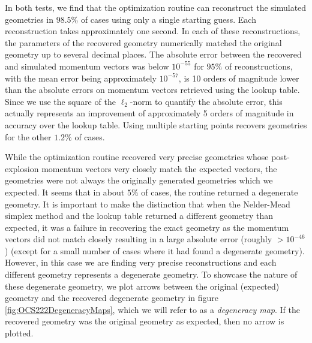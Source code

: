 In both tests, we find that the optimization routine can reconstruct the simulated geometries in $98.5\%$ of cases using only a single starting guess. Each reconstruction takes approximately one second. In each of these reconstructions, the parameters of the recovered geometry numerically matched the original geometry up to several decimal places. The absolute error between the recovered and simulated momentum vectors was below $10^{-55}$ for $95\%$ of reconstructions, with the mean error being approximately $10^{-57}$, is 10 orders of magnitude lower than the absolute errors on momentum vectors retrieved using the lookup table. Since we use the square of the $\ell_2$-norm to quantify the absolute error, this actually represents an improvement of approximately 5 orders of magnitude in accuracy over the lookup table. Using multiple starting points recovers geometries for the other $1.2\%$ of cases.

While the optimization routine recovered very precise geometries whose post-explosion momentum vectors very closely match the expected vectors, the geometries were not always the originally generated geometries which we expected. It seems that in about $5\%$ of cases, the routine returned a degenerate geometry. It is important to make the distinction that when the Nelder-Mead simplex method and the lookup table returned a different geometry than expected, it was a failure in recovering the exact geometry as the momentum vectors did not match closely resulting in a large absolute error (roughly $>10^{-46}$) (except for a small number of cases where it had found a degenerate geometry). However, in this case we are finding very precise reconstructions and each different geometry represents a degenerate geometry. To showcase the nature of these degenerate geometry, we plot arrows between the original (expected) geometry and the recovered degenerate geometry in figure \ref{fig:OCS222DegeneracyMaps}, which we will refer to as a \emph{degeneracy map}. If the recovered geometry was the original geometry as expected, then no arrow is plotted.

